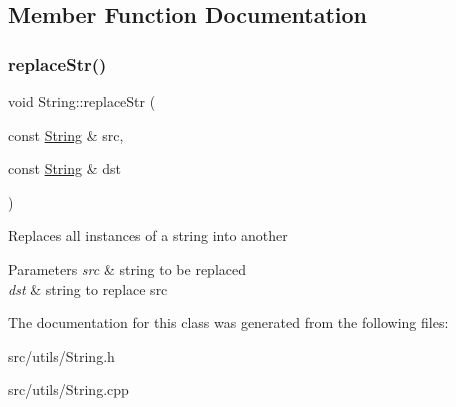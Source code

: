 \subsection{Member Function Documentation}
\mbox{\label{classString_aca0926e526b84e04a2141cd6aa694d6f}} 
\subsubsection{\texorpdfstring{replace\+Str()}{replaceStr()}}
{\footnotesize\ttfamily void String\+::replace\+Str (\begin{DoxyParamCaption}\item[{const \mbox{\hyperlink{classString}{String}} \&}]{src,  }\item[{const \mbox{\hyperlink{classString}{String}} \&}]{dst }\end{DoxyParamCaption})}

Replaces all instances of a string into another 
\begin{DoxyParams}{Parameters}
{\em src} & string to be replaced \\
\hline
{\em dst} & string to replace src \\
\hline
\end{DoxyParams}


The documentation for this class was generated from the following files\+:\begin{DoxyCompactItemize}
\item 
src/utils/String.\+h\item 
src/utils/String.\+cpp\end{DoxyCompactItemize}
